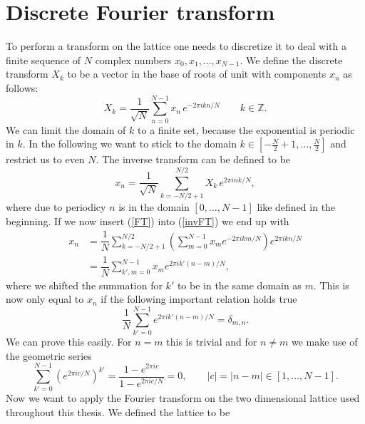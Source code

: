 \chapter{Discrete Fourier transform}
\label{app: disc_ft}
To perform a  transform on the lattice one needs to discretize it to deal with a finite sequence of $N$ complex numbers $x_{0},x_{1},\ldots,x_{N-1}$. We define the discrete  transform $X_{k}$ to be a vector in the base of roots of unit with components $x_{n}$ as follows:
\begin{equation}
X_{k}=\dfrac{1}{\sqrt{N}} \sum\limits_{n=0}^{N-1} x_{n} \, e ^{-2\pi  i kn /N} \qquad  k \in \mathbb{Z}.
\label{FT}
\end{equation}
We can limit the domain of $k$ to a finite set, because the exponential is periodic in $k$. In the following we want to stick to the domain $k \in \left[ -\tfrac{N}{2}+1,\ldots,\tfrac{N}{2} \right]$ and restrict us to even $N$. The inverse transform can be defined to be
%
\begin{equation}
 x_{n}= \dfrac{1}{\sqrt{N}} \sum\limits_{k=-N/2+1}^{N/2} X_{k} \, e ^{2 \pi  i nk /N},
 \label{invFT}
 \end{equation}
 where due to periodicy $n$ is in the domain $\left[0,\ldots,N-1\right]$ like defined in the beginning. If we now insert (\ref{FT}) into (\ref{invFT}) we end up with
\begin{align}
x_{n} &=\dfrac{1}{N}\sum\limits_{k=-N/2+1}^{N/2} \left( \sum\limits_{m=0}^{N-1} x_{m}  e ^{-2\pi  i km /N} \right)  e ^{2\pi  i kn /N} \\
%
%
&= \dfrac{1}{N} \sum\limits_{k',m=0}^{N-1} x_{m}  e ^{2\pi  i k'(n-m) /N},
\end{align}
where we shifted the summation for $k'$ to be in the same domain as $m$. This is now only equal to $x_{n}$ if the following important relation holds true
%
%
\begin{equation}
\dfrac{1}{N} \sum\limits_{k'=0}^{N-1}  e ^{2\pi  i k'(n-m) /N} = \delta_{m,n}.
\end{equation}
We can prove this easily. For $n=m$ this is trivial and for $n\neq m$ we make use of the geometric series
\begin{equation}
\sum\limits_{k'=0}^{N-1} \left( e ^{2\pi i  c/N }\right)^{k'} = \dfrac{1- e ^{2\pi i  c}}{1- e ^{2\pi i  c/N }} = 0, \qquad  \vert c\vert = \vert n-m \vert \in [1,\ldots,N-1].
\end{equation}
%
%
Now we want to apply the Fourier transform on the two dimensional lattice used throughout this thesis. We defined the lattice to be
